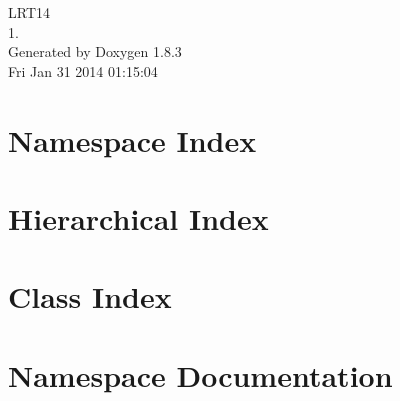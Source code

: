 \documentclass{book}
\begin{document}
\hypersetup{pageanchor=false,citecolor=blue}
\begin{titlepage}
\vspace*{7cm}
\begin{center}
{\Large L\-R\-T14 \\[1ex]\large 1. }\\
\vspace*{1cm}
{\large Generated by Doxygen 1.8.3}\\
\vspace*{0.5cm}
{\small Fri Jan 31 2014 01:15:04}\\
\end{center}
\end{titlepage}
\clearemptydoublepage
{}
\tableofcontents
\clearemptydoublepage
{}
\hypersetup{pageanchor=true,citecolor=blue}
\chapter{Namespace Index}

\chapter{Hierarchical Index}

\chapter{Class Index}

\chapter{Namespace Documentation}





\end{document}
